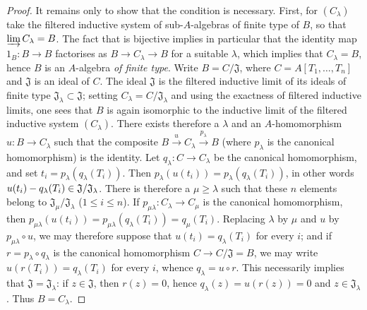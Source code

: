 \begin{proof}
It remains only to show that the condition is necessary.
First, for $(C_\lambda)$ take the filtered inductive system of sub-$A$-algebras of finite type of $B$, so that $\varinjlim C_\lambda=B$.
The fact that  is bijective implies in particular that the identity map $1_B:B\to B$ factorises as $B\to C_\lambda\to B$ for a suitable $\lambda$, which implies that $C_\lambda=B$, hence $B$ is an $A$-algebra \emph{of finite type}.
Write $B=C/\mathfrak{J}$, where $C=A[T_1,\ldots,T_n]$ and $\mathfrak{J}$ is an ideal of $C$. The ideal $\mathfrak{J}$ is the filtered inductive limit of its ideals of finite type $\mathfrak{J}_\lambda\subset\mathfrak{J}$; setting $C_\lambda=C/\mathfrak{J}_\lambda$ and using the exactness of filtered inductive limits, one sees that $B$ is again isomorphic to the inductive limit of the filtered inductive system $(C_\lambda)$.
There exists therefore a $\lambda$ and an $A$-homomorphism $u:B\to C_\lambda$ such that the composite $B\xrightarrow{u}C_\lambda\xrightarrow{p_\lambda}B$ (where $p_\lambda$ is the canonical homomorphism) is the identity.
Let $q_\lambda:C\to C_\lambda$ be the canonical homomorphism, and set
$t_i=p_\lambda(q_\lambda(T_i))$.
Then $p_\lambda(u(t_i))=p_\lambda(q_\lambda(T_i))$, in other words
$u(t_i)- q_\lambda(T_i)\in\mathfrak{J}/\mathfrak{J}_\lambda$.
There is therefore a $\mu\geqslant\lambda$ such that these $n$ elements belong to
$\mathfrak{J}_\mu/\mathfrak{J}_\lambda$ ($1\leqslant i\leqslant n$).
If $p_{\mu\lambda}:C_\lambda\to C_\mu$ is the canonical homomorphism, then
$p_{\mu\lambda}(u(t_i))=p_{\mu\lambda}(q_\lambda(T_i))=q_\mu(T_i)$.
Replacing $\lambda$ by $\mu$ and $u$ by $p_{\mu\lambda}\circ u$, we may therefore
suppose that $u(t_i)=q_\lambda(T_i)$ for every $i$; and if
$r=p_\lambda\circ q_\lambda$ is the canonical homomorphism
$C\to C/\mathfrak{J}=B$, we may write $u(r(T_i))=q_\lambda(T_i)$ for every $i$,
whence $q_\lambda=u\circ r$.
This necessarily implies that $\mathfrak{J}=\mathfrak{J}_\lambda$: if $z\in\mathfrak{J}$, then $r(z)=0$, hence $q_\lambda(z)=u(r(z))=0$ and $z\in\mathfrak{J}_\lambda$. Thus $B=C_\lambda$.


\end{proof}

